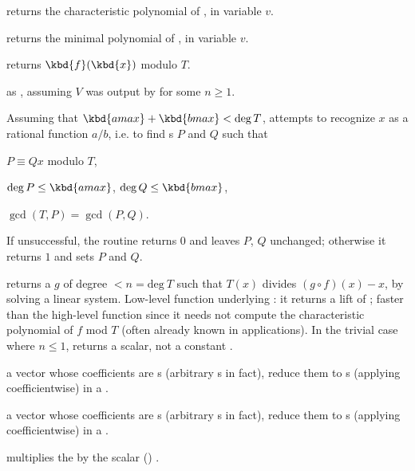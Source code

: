  returns the characteristic
polynomial of , in variable $v$.

 returns the minimal
polynomial of , in variable $v$.

 returns $\kbd{f}(\kbd{x})$ modulo
$T$.

 as ,
assuming $V$ was output by  for some $n\geq 1$.

Assuming that $\kbd{amax}+\kbd{bmax}<\deg T$, attempts to recognize $x$ as a
rational function $a/b$, i.e. to find s $P$ and $Q$ such that

\item $P \equiv Q x$ modulo $T$,

\item $\deg P \leq \kbd{amax}$, $\deg Q \leq \kbd{bmax}$,

\item $\gcd(T,P) = \gcd(P,Q)$.

\noindent If unsuccessful, the routine returns $0$ and leaves $P$, $Q$
unchanged; otherwise it returns $1$ and sets $P$ and $Q$.

 returns a  $g$ of degree $< n
= \text{deg}~T$ such that $T(x)$ divides $(g \circ f)(x) - x$, by solving a
linear system. Low-level function underlying : it returns a
lift of \kbd[modreverse(f,T)]; faster than the high-level function since it
needs not compute the characteristic polynomial of $f$ mod $T$ (often already
known in applications). In the trivial case where $n \leq 1$, returns a
scalar, not a constant .


  a vector whose
coefficients are s (arbitrary s in fact), reduce them to
s (applying  coefficientwise) in a .

  a vector whose
coefficients are s (arbitrary s in fact), reduce them to
s (applying  coefficientwise) in a .

  multiplies the
   by the scalar () .

